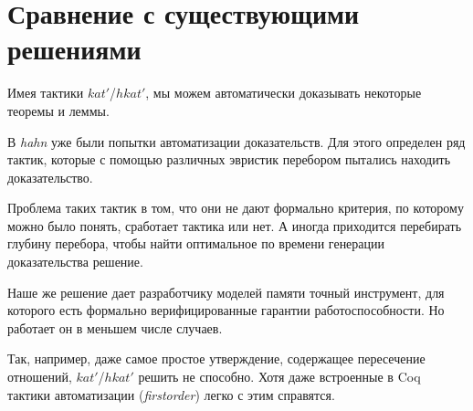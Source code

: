 \documentclass[times
              ]{itmo-student-thesis}
\begin{document}



  \section{Сравнение с существующими решениями}

    Имея тактики $ kat' $/$ hkat' $, мы можем автоматически доказывать некоторые теоремы и леммы.

    В \textit{hahn} уже были попытки автоматизации доказательств.
    Для этого определен ряд тактик, которые с помощью различных эвристик перебором пытались находить доказательство.

    Проблема таких тактик в том, что они не дают формально критерия, по которому можно было понять, сработает тактика или нет.
    А иногда приходится перебирать глубину перебора, чтобы найти оптимальное по времени генерации доказательства решение.

    Наше же решение дает разработчику моделей памяти точный инструмент, для которого есть формально верифицированные гарантии работоспособности.
    Но работает он в меньшем числе случаев.

    Так, например, даже самое простое утверждение, содержащее пересечение отношений, $ kat' $/$ hkat' $ решить не способно.
    Хотя даже встроенные в Coq тактики автоматизации (\textit{firstorder}) легко с этим справятся.
\end{document}
